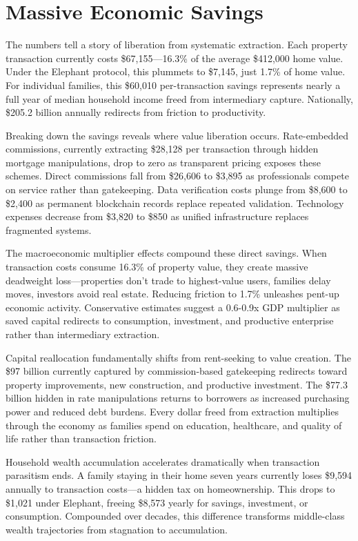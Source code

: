 \section{Massive Economic Savings}

The numbers tell a story of liberation from systematic extraction. Each property transaction currently costs \$67,155—16.3\% of the average \$412,000 home value. Under the Elephant protocol, this plummets to \$7,145, just 1.7\% of home value. For individual families, this \$60,010 per-transaction savings represents nearly a full year of median household income freed from intermediary capture. Nationally, \$205.2 billion annually redirects from friction to productivity.

Breaking down the savings reveals where value liberation occurs. Rate-embedded commissions, currently extracting \$28,128 per transaction through hidden mortgage manipulations, drop to zero as transparent pricing exposes these schemes. Direct commissions fall from \$26,606 to \$3,895 as professionals compete on service rather than gatekeeping. Data verification costs plunge from \$8,600 to \$2,400 as permanent blockchain records replace repeated validation. Technology expenses decrease from \$3,820 to \$850 as unified infrastructure replaces fragmented systems.

The macroeconomic multiplier effects compound these direct savings. When transaction costs consume 16.3\% of property value, they create massive deadweight loss—properties don't trade to highest-value users, families delay moves, investors avoid real estate. Reducing friction to 1.7\% unleashes pent-up economic activity. Conservative estimates suggest a 0.6-0.9x GDP multiplier as saved capital redirects to consumption, investment, and productive enterprise rather than intermediary extraction.

Capital reallocation fundamentally shifts from rent-seeking to value creation. The \$97 billion currently captured by commission-based gatekeeping redirects toward property improvements, new construction, and productive investment. The \$77.3 billion hidden in rate manipulations returns to borrowers as increased purchasing power and reduced debt burdens. Every dollar freed from extraction multiplies through the economy as families spend on education, healthcare, and quality of life rather than transaction friction.

Household wealth accumulation accelerates dramatically when transaction parasitism ends. A family staying in their home seven years currently loses \$9,594 annually to transaction costs—a hidden tax on homeownership. This drops to \$1,021 under Elephant, freeing \$8,573 yearly for savings, investment, or consumption. Compounded over decades, this difference transforms middle-class wealth trajectories from stagnation to accumulation.

